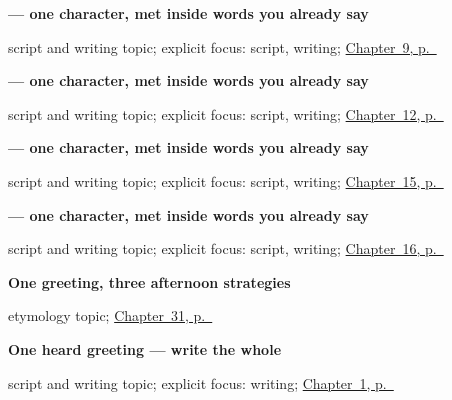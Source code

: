 \noindent\begin{minipage}[t]{\linewidth}
\raggedright
\textbf{ — one character, met inside words you already say}\par
\footnotesize script and writing topic; explicit focus: script, writing; \hyperref[ch:ml-sorry]{Chapter~9, p.~\pageref*{ch:ml-sorry}}
\end{minipage}\par\smallskip

\noindent\begin{minipage}[t]{\linewidth}
\raggedright
\textbf{ — one character, met inside words you already say}\par
\footnotesize script and writing topic; explicit focus: script, writing; \hyperref[ch:ml-family]{Chapter~12, p.~\pageref*{ch:ml-family}}
\end{minipage}\par\smallskip

\noindent\begin{minipage}[t]{\linewidth}
\raggedright
\textbf{ — one character, met inside words you already say}\par
\footnotesize script and writing topic; explicit focus: script, writing; \hyperref[ch:ml-water-and-rice]{Chapter~15, p.~\pageref*{ch:ml-water-and-rice}}
\end{minipage}\par\smallskip

\noindent\begin{minipage}[t]{\linewidth}
\raggedright
\textbf{ — one character, met inside words you already say}\par
\footnotesize script and writing topic; explicit focus: script, writing; \hyperref[ch:ml-traditional-months]{Chapter~16, p.~\pageref*{ch:ml-traditional-months}}
\end{minipage}\par\smallskip

\noindent\begin{minipage}[t]{\linewidth}
\raggedright
\textbf{One greeting, three afternoon strategies}\par
\footnotesize etymology topic; \hyperref[ch:ml-good-afternoon]{Chapter~31, p.~\pageref*{ch:ml-good-afternoon}}
\end{minipage}\par\smallskip

\noindent\begin{minipage}[t]{\linewidth}
\raggedright
\textbf{One heard greeting — write the whole}\par
\footnotesize script and writing topic; explicit focus: writing; \hyperref[ch:greetings]{Chapter~1, p.~\pageref*{ch:greetings}}
\end{minipage}\par\smallskip

